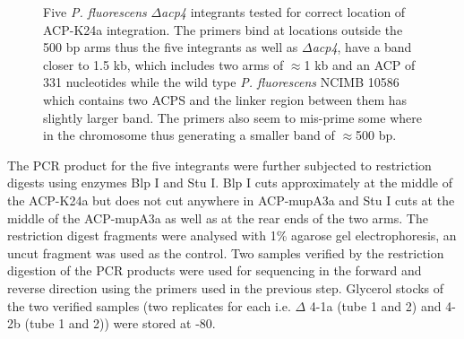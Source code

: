 		\setlength\fboxsep{5pt}
		\setlength\fboxrule{1.5pt}
		\begin{figure}[htbp]
		\centering
		\caption[Five \textit{P. fluorescens} $ \Delta $\textit{acp4} integrants tested for correct location of ACP-K24a integration.]{Five \textit{P. fluorescens} $ \Delta $\textit{acp4} integrants tested for correct location of ACP-K24a integration.  The primers bind at locations outside the 500 bp arms thus the five integrants as well as $ \Delta $\textit{acp4}, have a band closer to 1.5 kb, which includes two arms of $ \approx $1 kb and an ACP of 331 nucleotides  while the wild type \textit{P. fluorescens} NCIMB 10586 which contains two ACPS and the linker region between them has slightly larger band. The primers also seem to mis-prime some where in the chromosome thus generating a smaller band of $ \approx $500 bp. }
		\label{fig:delta4extended}
		\end{figure}		

	The PCR product for the five integrants were further subjected to restriction digests using enzymes Blp I and Stu I. Blp I cuts approximately at the middle of the ACP-K24a but does not cut anywhere in ACP-mupA3a and Stu I cuts at the middle of the ACP-mupA3a as well as at the rear ends of the two arms. The restriction digest fragments were analysed with 1\% agarose gel electrophoresis, an uncut fragment was used as the control. Two samples verified by the restriction digestion of the PCR products were used for sequencing in the forward and reverse direction using the primers used in the previous step. Glycerol stocks of the two verified samples (two replicates for each i.e. $ \Delta $ 4-1a (tube 1 and 2) and 4-2b (tube 1 and 2)) were stored at -80\textcelsius.	
	

